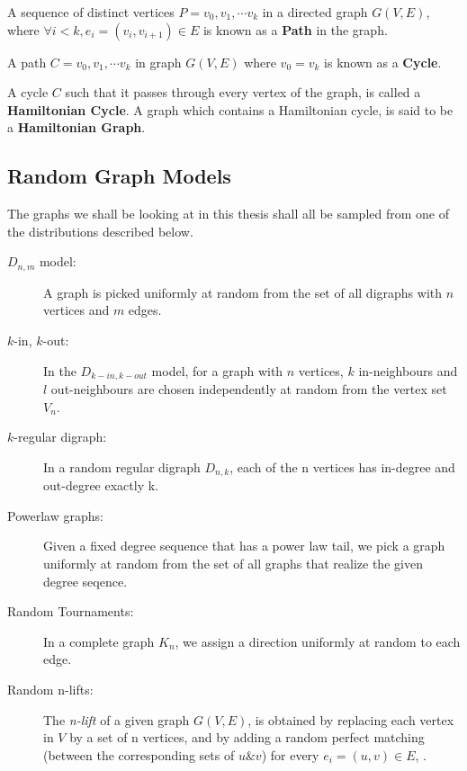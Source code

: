 \begin{defn}
A sequence of distinct vertices $P = v_0, v_1, \cdots v_k$ in a directed graph $G(V, E)$, where $\forall i<k, e_i = (v_i, v_{i+1}) \in E$ is known as a \textbf{Path} in the graph.
\end{defn}

\begin{defn}
A path $C = v_0, v_1, \cdots v_k$ in graph $G(V, E)$ where $v_0 = v_k$ is known as a \textbf{Cycle}.
\end{defn}

\begin{defn}
A cycle $C$ such that it passes through every vertex of the graph, is called a \textbf{Hamiltonian Cycle}.
A graph which contains a Hamiltonian cycle, is said to be a \textbf{Hamiltonian Graph}.
\end{defn}

\subsection{Random Graph Models}
The graphs we shall be looking at in this thesis shall all be sampled from one of the distributions described below.
\begin{description}
    \item[$D_{n, m}$ model: ] A graph is picked uniformly at random from the set of all digraphs with $n$ vertices and $m$ edges.
    \item[$k$-in, $k$-out: ] In the $D_{k-in, k-out}$ model, for a graph with $n$ vertices, $k$ in-neighbours and $l$ out-neighbours are chosen independently at random from the vertex set $V_n$. 
    \item[$k$-regular digraph: ] In a random regular digraph $D_{n, k}$, each of the n vertices has in-degree and out-degree exactly k.
    \item[Powerlaw graphs: ] Given a fixed degree sequence that has a power law tail, we pick a graph uniformly at random from the set of all graphs that realize the given degree seqence.
    \item[Random Tournaments: ] In a complete graph $K_n$, we assign a direction uniformly at random to each edge.
    \item[Random n-lifts: ] The \textit{n-lift} of a given graph $G(V, E)$, is obtained by replacing each vertex in $V$ by a set of n vertices, and by adding a random perfect matching (between the corresponding sets of $u \& v$) for every $e_i = (u, v) \in E$, .
\end{description}
